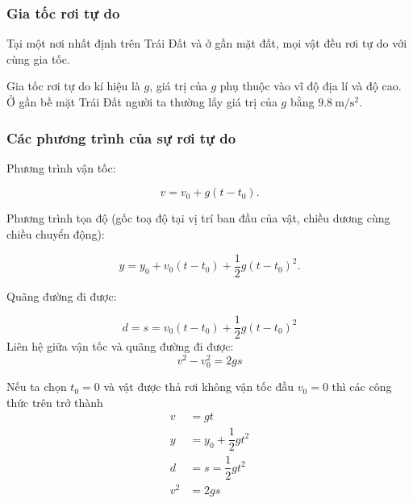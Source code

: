 \subsubsection{Gia tốc rơi tự do}
Tại một nơi nhất định trên Trái Đất và ở gần mặt đất, mọi vật đều rơi tự do với cùng gia tốc.

Gia tốc rơi tự do kí hiệu là $g$, giá trị của $g$ phụ thuộc vào vĩ độ địa lí và độ cao. Ở gần bề mặt Trái Đất người ta thường lấy giá trị của $g$ bằng $\SI{9.8}{\meter/\second^2}$.
\subsubsection{Các phương trình của sự rơi tự do}

Phương trình vận tốc:

\begin{equation*}
	v = v_0+g(t -t_0).
\end{equation*}

Phương trình tọa độ (gốc toạ độ tại vị trí ban đầu của vật, chiều dương cùng chiều chuyển động):

\begin{equation*}
	y = y_0 +v_0(t-t_0)+ \dfrac{1}{2}g(t -t_0)^2.
\end{equation*}

Quãng đường đi được:

\begin{equation*}
	d= s = v_0(t-t_0)+\dfrac{1}{2} g (t-t_0)^2
\end{equation*}
Liên hệ giữa vận tốc và quãng đường đi được:
$$v^2-v^2_0=2gs$$

Nếu ta chọn $t_{0}=0$ và vật được thả rơi không vận tốc đầu $v_0=0$ thì các công thức trên trở thành
\begin{align*}
	v&=gt\\	
	y&=y_0+\dfrac{1}{2}gt^{2}\\
	d&=s=\dfrac{1}{2}gt^{2}\\
	v^2&=2gs
\end{align*}



